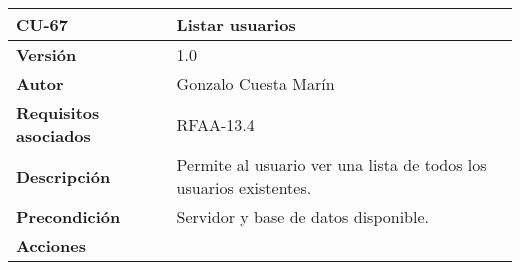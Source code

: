 \begin{longtable}[]{@{}ll@{}}
\toprule
\begin{minipage}[b]{0.20\columnwidth}\raggedright
\textbf{CU-67}\strut
\end{minipage} & \begin{minipage}[b]{0.74\columnwidth}\raggedright
\textbf{Listar usuarios}\strut
\end{minipage}\tabularnewline
\midrule
\endhead
\begin{minipage}[t]{0.20\columnwidth}\raggedright
\textbf{Versión}\strut
\end{minipage} & \begin{minipage}[t]{0.74\columnwidth}\raggedright
1.0\strut
\end{minipage}\tabularnewline
\begin{minipage}[t]{0.20\columnwidth}\raggedright
\textbf{Autor}\strut
\end{minipage} & \begin{minipage}[t]{0.74\columnwidth}\raggedright
Gonzalo Cuesta Marín\strut
\end{minipage}\tabularnewline
\begin{minipage}[t]{0.20\columnwidth}\raggedright
\textbf{Requisitos asociados}\strut
\end{minipage} & \begin{minipage}[t]{0.74\columnwidth}\raggedright
RFAA-13.4\strut
\end{minipage}\tabularnewline
\begin{minipage}[t]{0.20\columnwidth}\raggedright
\textbf{Descripción}\strut
\end{minipage} & \begin{minipage}[t]{0.74\columnwidth}\raggedright
Permite al usuario ver una lista de todos los usuarios existentes.\strut
\end{minipage}\tabularnewline
\begin{minipage}[t]{0.20\columnwidth}\raggedright
\textbf{Precondición}\strut
\end{minipage} & \begin{minipage}[t]{0.74\columnwidth}\raggedright
Servidor y base de datos disponible.\strut
\end{minipage}\tabularnewline
\begin{minipage}[t]{0.20\columnwidth}\raggedright
\textbf{Acciones}\strut
\end{minipage} & \begin{minipage}[t]{0.74\columnwidth}\raggedright
\begin{enumerate}

\end{enumerate}
\end{minipage}
\end{longtable}
